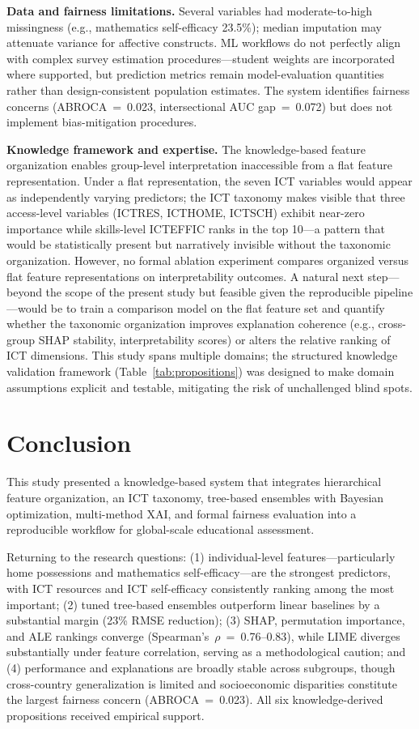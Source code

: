 \documentclass[review,12pt]{elsarticle}
\begin{document}
\textbf{Data and fairness limitations.}
Several variables had moderate-to-high missingness (e.g., mathematics self-efficacy 23.5\%); median imputation may attenuate variance for affective constructs. ML workflows do not perfectly align with complex survey estimation procedures---student weights are incorporated where supported, but prediction metrics remain model-evaluation quantities rather than design-consistent population estimates. The system identifies fairness concerns (ABROCA~=~0.023, intersectional AUC gap~=~0.072) but does not implement bias-mitigation procedures.

\textbf{Knowledge framework and expertise.}
The knowledge-based feature organization enables group-level interpretation inaccessible from a flat feature representation. Under a flat representation, the seven ICT variables would appear as independently varying predictors; the ICT taxonomy makes visible that three access-level variables (ICTRES, ICTHOME, ICTSCH) exhibit near-zero importance while skills-level ICTEFFIC ranks in the top 10---a pattern that would be statistically present but narratively invisible without the taxonomic organization. However, no formal ablation experiment compares organized versus flat feature representations on interpretability outcomes. A natural next step---beyond the scope of the present study but feasible given the reproducible pipeline---would be to train a comparison model on the flat feature set and quantify whether the taxonomic organization improves explanation coherence (e.g., cross-group SHAP stability, interpretability scores) or alters the relative ranking of ICT dimensions. This study spans multiple domains; the structured knowledge validation framework (Table~\ref{tab:propositions}) was designed to make domain assumptions explicit and testable, mitigating the risk of unchallenged blind spots.

\section{Conclusion}

This study presented a knowledge-based system that integrates hierarchical feature organization, an ICT taxonomy, tree-based ensembles with Bayesian optimization, multi-method XAI, and formal fairness evaluation into a reproducible workflow for global-scale educational assessment.

Returning to the research questions: (1) individual-level features---particularly home possessions and mathematics self-efficacy---are the strongest predictors, with ICT resources and ICT self-efficacy consistently ranking among the most important; (2) tuned tree-based ensembles outperform linear baselines by a substantial margin (23\% RMSE reduction); (3) SHAP, permutation importance, and ALE rankings converge (Spearman's~$\rho$~=~0.76--0.83), while LIME diverges substantially under feature correlation, serving as a methodological caution; and (4) performance and explanations are broadly stable across subgroups, though cross-country generalization is limited and socioeconomic disparities constitute the largest fairness concern (ABROCA~=~0.023). All six knowledge-derived propositions received empirical support.
\end{document}
